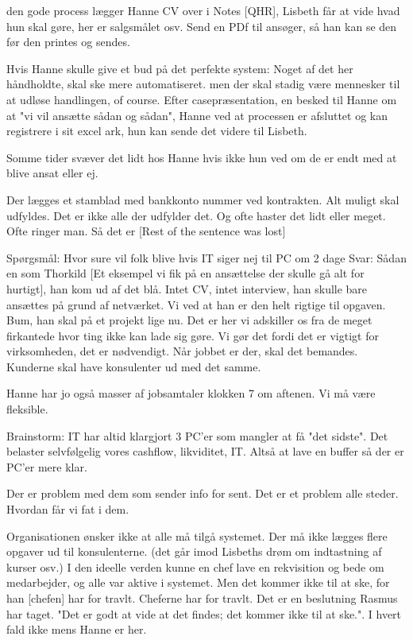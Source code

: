 \begin{linenumbers*}
[I] den gode process lægger Hanne CV over i Notes [QHR], Lisbeth får at vide hvad hun skal gøre, her er salgsmålet osv. Send en PDf til ansøger, så han kan se den før den printes og sendes.

Hvis Hanne skulle give et bud på det perfekte system:
Noget af det her håndholdte, skal ske mere automatiseret. men der skal stadig være mennesker til at udløse handlingen, of course. 
Efter casepræsentation, en besked til Hanne om at "vi vil ansætte sådan og sådan", Hanne ved at processen er afsluttet og kan registrere i sit excel ark, hun kan sende det videre til Lisbeth.

Somme tider svæver det lidt hos Hanne hvis ikke hun ved om de er endt med at blive ansat eller ej.

Der lægges et stamblad med bankkonto nummer ved kontrakten. Alt muligt skal udfyldes. Det er ikke alle der udfylder det. Og ofte haster det lidt eller meget. Ofte ringer man. Så det er [Rest of the sentence was lost]




Spørgsmål:
Hvor sure vil folk blive hvis IT siger nej til PC om 2 dage
Svar:
Sådan en som Thorkild [Et eksempel vi fik på en ansættelse der skulle gå alt for hurtigt], han kom ud af det blå.  Intet CV, intet interview, han skulle bare ansættes på grund af netværket. Vi ved at han er den helt rigtige til opgaven. Bum, han skal på et projekt lige nu.
Det er her vi adskiller os fra de meget firkantede hvor ting ikke kan lade sig gøre. 
Vi gør det fordi det er vigtigt for virksomheden, det er nødvendigt. Når jobbet er der, skal det bemandes.
Kunderne skal have konsulenter ud med det samme.

Hanne har jo også masser af jobsamtaler klokken 7 om aftenen. Vi må være fleksible.

Brainstorm: IT har altid klargjort 3 PC'er som mangler at få "det sidste". Det belaster selvfølgelig vores cashflow, likviditet, IT.
Altså at lave en buffer så der er PC'er mere klar. 


Der er problem med dem som sender info for sent. Det er et problem alle steder. Hvordan får vi fat i dem.


Organisationen ønsker ikke at alle må tilgå systemet. Der må ikke lægges flere opgaver ud til konsulenterne. (det går imod Lisbeths drøm om indtastning af kurser osv.)
I den ideelle verden kunne en chef lave en rekvisition og bede om medarbejder, og alle var aktive i systemet. Men det kommer ikke til at ske, for han  [chefen] har for travlt.
Cheferne har for travlt. Det er en beslutning Rasmus har taget. "Det er godt at vide at det findes; det kommer ikke til at ske.". I hvert fald ikke mens Hanne er her.


\end{linenumbers*}
